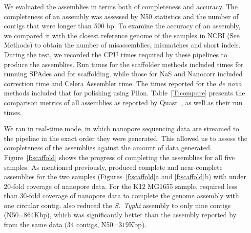 We evaluated the assemblies in terms both of completeness and accuracy.
The completeness of an assembly was assessed by N50 statistics and the
number of contigs that were longer than 500 bp. To examine the accuracy of an
assembly, we compared it with the closest reference genome of the samples in
NCBI (See Methods) to obtain the number of misassemblies, mismatches and
short indels.
During the test, we recorded the CPU times
required by these pipelines to produce the assemblies. Run times for
the scaffolder methods included times for running SPAdes and for scaffolding,
while those for NaS and Nanocorr included correction time and Celera
Assembler time.
The times reported for the \emph{de novo} methods included that for
polishing using Pilon.
Table~\ref{T:compare} presents the comparison metrics of all assemblies as 
reported by Quast~\cite{GurevichSV2013}, as well as their run times. 
 
We ran \npscarf{} in real-time mode, in which nanopore sequencing data are
streamed to the pipeline in the exact order they were generated.
This allowed us to assess the completeness of the assemblies against the 
amount of data generated.
Figure~\ref{f:scaffold} shows the progress of completing the assemblies
for all five samples. As mentioned previously, \npscarf{} produced complete and
near-complete assemblies for the two \kp{} samples (Figures~\ref{f:scaffold}a
and \ref{f:scaffold}b) with under 20-fold coverage of nanopore data.
For the \ec{} K12 MG1655 sample, \npscarf{} required less than 30-fold coverage of 
nanopore data to complete the genome assembly with one circular contig.
\npscarf{} also reduced the \emph{S.~Typhi} assembly to only nine contigs (N50=$864$Kbp),
which was significantly better than the assembly reported by~\cite{AshtonND2015} 
from the same data (34 contigs, N50=$319$Kbp).

